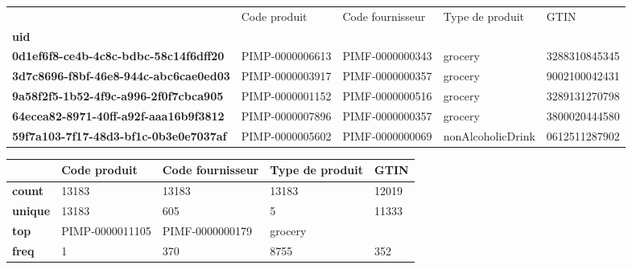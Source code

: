 \begin{tabularx}{\linewidth}{lXXXX}
\toprule
{} &     Code produit & Code fournisseur &    Type de produit &           GTIN \\
\textbf{uid                                 } &                  &                  &                    &                \\
\midrule
\textbf{0d1ef6f8-ce4b-4c8c-bdbc-58c14f6dff20} &  PIMP-0000006613 &  PIMF-0000000343 &            grocery &  3288310845345 \\
\textbf{3d7c8696-f8bf-46e8-944c-abc6cae0ed03} &  PIMP-0000003917 &  PIMF-0000000357 &            grocery &  9002100042431 \\
\textbf{9a58f2f5-1b52-4f9c-a996-2f0f7cbca905} &  PIMP-0000001152 &  PIMF-0000000516 &            grocery &  3289131270798 \\
\textbf{64ecea82-8971-40ff-a92f-aaa16b9f3812} &  PIMP-0000007896 &  PIMF-0000000357 &            grocery &  3800020444580 \\
\textbf{59f7a103-7f17-48d3-bf1c-0b3e0e7037af} &  PIMP-0000005602 &  PIMF-0000000069 &  nonAlcoholicDrink &  0612511287902 \\
\bottomrule
\end{tabularx}
\begin{tabularx}{\linewidth}{lXXXX}
\toprule
{} &     Code produit & Code fournisseur & Type de produit &   GTIN \\
\midrule
\textbf{count } &            13183 &            13183 &           13183 &  12019 \\
\textbf{unique} &            13183 &              605 &               5 &  11333 \\
\textbf{top   } &  PIMP-0000011105 &  PIMF-0000000179 &         grocery &        \\
\textbf{freq  } &                1 &              370 &            8755 &    352 \\
\bottomrule
\end{tabularx}
